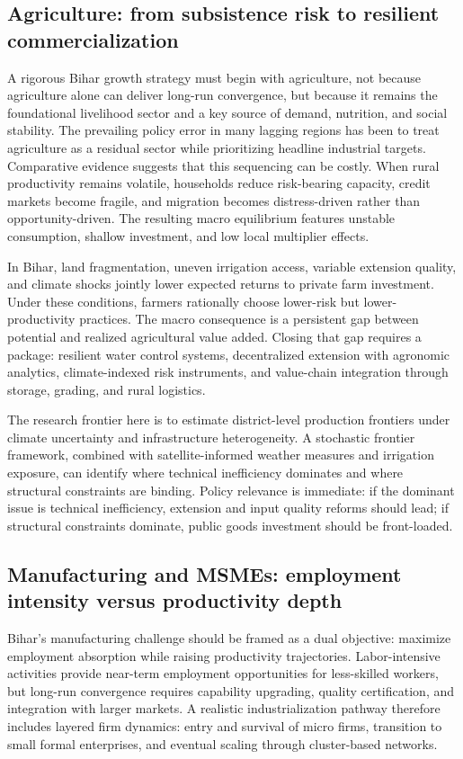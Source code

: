 \documentclass[preprint,12pt]{elsarticle}
\begin{document}
\subsection{Agriculture: from subsistence risk to resilient commercialization}
A rigorous Bihar growth strategy must begin with agriculture, not because agriculture alone can deliver long-run convergence, but because it remains the foundational livelihood sector and a key source of demand, nutrition, and social stability. The prevailing policy error in many lagging regions has been to treat agriculture as a residual sector while prioritizing headline industrial targets. Comparative evidence suggests that this sequencing can be costly. When rural productivity remains volatile, households reduce risk-bearing capacity, credit markets become fragile, and migration becomes distress-driven rather than opportunity-driven. The resulting macro equilibrium features unstable consumption, shallow investment, and low local multiplier effects.

In Bihar, land fragmentation, uneven irrigation access, variable extension quality, and climate shocks jointly lower expected returns to private farm investment. Under these conditions, farmers rationally choose lower-risk but lower-productivity practices. The macro consequence is a persistent gap between potential and realized agricultural value added. Closing that gap requires a package: resilient water control systems, decentralized extension with agronomic analytics, climate-indexed risk instruments, and value-chain integration through storage, grading, and rural logistics.

The research frontier here is to estimate district-level production frontiers under climate uncertainty and infrastructure heterogeneity. A stochastic frontier framework, combined with satellite-informed weather measures and irrigation exposure, can identify where technical inefficiency dominates and where structural constraints are binding. Policy relevance is immediate: if the dominant issue is technical inefficiency, extension and input quality reforms should lead; if structural constraints dominate, public goods investment should be front-loaded.

\subsection{Manufacturing and MSMEs: employment intensity versus productivity depth}
Bihar's manufacturing challenge should be framed as a dual objective: maximize employment absorption while raising productivity trajectories. Labor-intensive activities provide near-term employment opportunities for less-skilled workers, but long-run convergence requires capability upgrading, quality certification, and integration with larger markets. A realistic industrialization pathway therefore includes layered firm dynamics: entry and survival of micro firms, transition to small formal enterprises, and eventual scaling through cluster-based networks.
\end{document}
